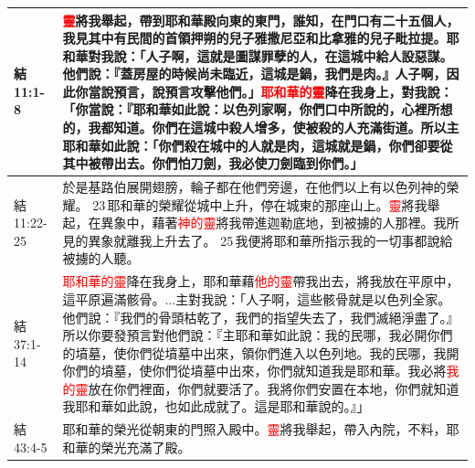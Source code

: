 \begin{table}[H]
\begin{tabular}{p{5em}p{45em}}
結11:1-8&\textcolor{red}{靈}將我舉起，帶到耶和華殿向東的東門，誰知，在門口有二十五個人，我見其中有民間的首領押朔的兒子雅撒尼亞和比拿雅的兒子毗拉提。耶和華對我說：「人子啊，這就是圖謀罪孽的人，在這城中給人設惡謀。他們說：『蓋房屋的時候尚未臨近，這城是鍋，我們是肉。』人子啊，因此你當說預言，說預言攻擊他們。」\textcolor{red}{耶和華的靈}降在我身上，對我說：「你當說：『耶和華如此說：以色列家啊，你們口中所說的，心裡所想的，我都知道。你們在這城中殺人增多，使被殺的人充滿街道。所以主耶和華如此說：「你們殺在城中的人就是肉，這城就是鍋，你們卻要從其中被帶出去。你們怕刀劍，我必使刀劍臨到你們。」\\  \midrule


結11:22-25&於是基路伯展開翅膀，輪子都在他們旁邊，在他們以上有以色列神的榮耀。 23 耶和華的榮耀從城中上升，停在城東的那座山上。\textcolor{red}{靈}將我舉起，在異象中，藉著\textcolor{red}{神的靈}將我帶進迦勒底地，到被擄的人那裡。我所見的異象就離我上升去了。 25 我便將耶和華所指示我的一切事都說給被擄的人聽。\\  \midrule
結37:1-14&\textcolor{red}{耶和華的靈}降在我身上，耶和華藉\textcolor{red}{他的靈}帶我出去，將我放在平原中，這平原遍滿骸骨。...主對我說：「人子啊，這些骸骨就是以色列全家。他們說：『我們的骨頭枯乾了，我們的指望失去了，我們滅絕淨盡了。』 所以你要發預言對他們說：『主耶和華如此說：我的民哪，我必開你們的墳墓，使你們從墳墓中出來，領你們進入以色列地。我的民哪，我開你們的墳墓，使你們從墳墓中出來，你們就知道我是耶和華。我必將\textcolor{red}{我的靈}放在你們裡面，你們就要活了。我將你們安置在本地，你們就知道我耶和華如此說，也如此成就了。這是耶和華說的。』」\\  \midrule
結43:4-5&耶和華的榮光從朝東的門照入殿中。\textcolor{red}{靈}將我舉起，帶入內院，不料，耶和華的榮光充滿了殿。\\  \midrule

\end{tabular}
\end{table}


